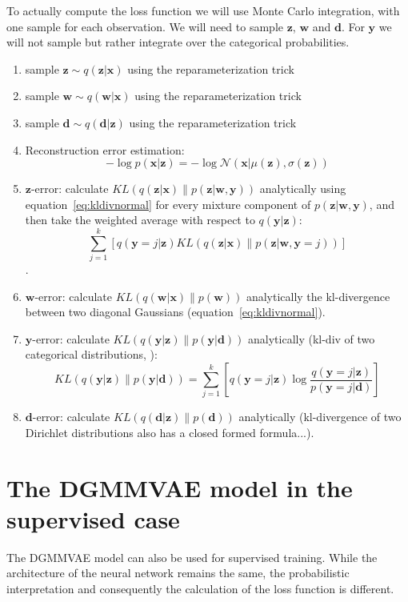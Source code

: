 \documentclass[11pt, a4paper]{report}
\theoremstyle{plain}
\theoremstyle{definition}
\theoremstyle{remark}
\newcommand{\x}{\mathbf{x}}
\newcommand{\z}{\mathbf{z}}
\newcommand{\y}{\mathbf{y}}
\newcommand{\w}{\mathbf{w}}
\newcommand{\dd}{\mathbf{d}}
\newcommand{\NN}{\mathcal{N}}
\begin{document}
To actually compute the loss function we will use Monte Carlo integration,
with one sample for each observation.
We will need to sample $\z$, $\w$ and $\dd$. For $\y$ we will not sample but
rather integrate over the categorical probabilities.


\begin{enumerate}
\item{sample} $\z \sim q(\z | \x)$ using the reparameterization trick
\item{sample} $\w \sim q(\w | \x)$ using the reparameterization trick
\item{sample} $\dd \sim q(\dd | \z)$ using the reparameterization trick
\item{Reconstruction error estimation}:
$$-\log p(\x | \z) = -\log \NN(\x | \mu(\z), \sigma(\z))$$
\item{$\z$-error}: calculate $KL(q(\z | \x) \| p(\z | \w, \y))$ analytically
using equation~\ref{eq:kldivnormal}
for every mixture component of $p(\z | \w, \y)$,
and then take the weighted average with respect
to $q(\y | \z)$:
$$\sum_{j=1}^k [ q(\y=j | \z) KL(q(\z | \x) \| p(\z | \w, \y=j))]$$.
\item{$\w$-error}: calculate $KL(q(\w | \x) \| p(\w))$ analytically 
the kl-divergence between two diagonal Gaussians (equation~\ref{eq:kldivnormal}).
\item{$\y$-error}:
calculate $KL(q(\y | \z) \| p(\y | \dd))$ analytically (kl-div of
two categorical distributions, ):
$$KL(q(\y | \z) \| p(\y | \dd)) = 
\sum_{j=1}^k [ q(\y=j | \z) \log \frac{q(\y=j | \z)}{p(\y = j | \dd)}]$$
\item{$\dd$-error}:
calculate $KL(q(\dd | \z) \| p(\dd))$ analytically
(kl-divergence of two Dirichlet distributions also has a closed formed
formula...).
\end{enumerate}

\section{The DGMMVAE model in the supervised case}

The DGMMVAE model can also be used for supervised training. While the
architecture of the neural network remains the same, the probabilistic
interpretation and consequently the calculation of the loss function is
different.
\end{document}
